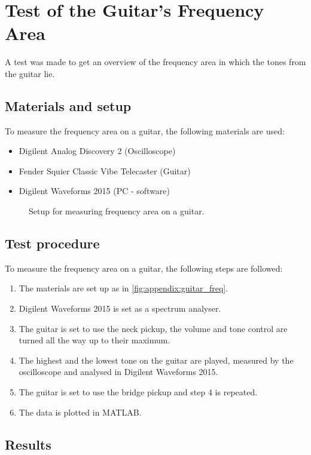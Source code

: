 \chapter{Test of the Guitar's Frequency Area}\label{app:frequency_area}
A test was made to get an overview of the frequency area in which the tones from the guitar lie.

\section*{Materials and setup}
To measure the frequency area on a guitar, the following materials are used:
\begin{itemize}
\item Digilent Analog Discovery 2 (Oscilloscope)
\item Fender Squier Classic Vibe Telecaster (Guitar)
\item Digilent Waveforms 2015 (PC - software)
\end{itemize}

\begin{figure}[htbp!]
\centering
\def\svgwidth{\columnwidth}

\caption{Setup for measuring frequency area on a guitar.}
		\label{fig:appendix:guitar_freq}
\end{figure}

\section*{Test procedure}
To measure the frequency area on a guitar, the following steps are followed:
\begin{enumerate}
\item The materials are set up as in \autoref{fig:appendix:guitar_freq}.
\item Digilent Waveforms 2015 is set as a spectrum analyser. 
\item The guitar is set to use the neck pickup, the volume and tone control are turned all the way up to their maximum.
\item The highest and the lowest tone on the guitar are played, measured by the oscilloscope and analysed in Digilent Waveforms 2015.
\item The guitar is set to use the bridge pickup and step 4 is repeated. 
\item The data is plotted in MATLAB.
\end{enumerate}

\section*{Results}

